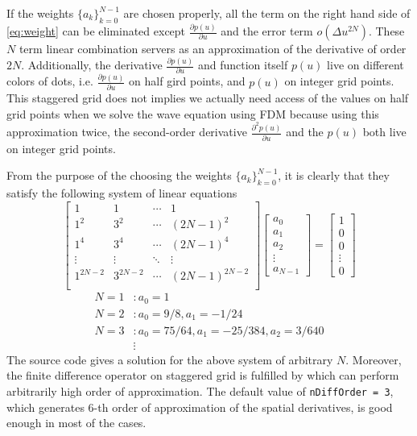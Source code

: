 \documentclass[11pt]{article}
\theoremstyle{plain}
\theoremstyle{definition}
\theoremstyle{remark}
\numberwithin{equation}{section}
\begin{document}
If the weights $\{ a_k\}_{k=0}^{N-1}$ are chosen properly, all the term on the right hand side of \eqref{eq:weight} can be eliminated except $\frac{\partial p(u)}{\partial u}$ and the error term $o(\Delta u^{2N})$. These $N$ term linear combination servers as an approximation of the derivative of order $2N$. Additionally, the derivative $\frac{\partial p(u)}{\partial u}$ and function itself $p(u)$ live on different colors of dots, i.e. $\frac{\partial p(u)}{\partial u}$ on half gird points, and $p(u)$ on integer grid points. This staggered grid does not implies we actually need access of the values on half grid points when we solve the wave equation using FDM because using this approximation twice, the second-order derivative $\frac{\partial^2 p(u)}{\partial u}$ and the $p(u)$ both live on integer grid points.

From the purpose of the choosing the weights $\{a_k\}_{k=0}^{N-1}$, it is clearly that they satisfy the following system of linear equations
\begin{equation*}
\begin{bmatrix}
  1 & 1 & \cdots & 1 \\
  1^2 & 3^2 & \cdots & (2N-1)^2 \\
  1^4 & 3^4 & \cdots & (2N-1)^4 \\
  \vdots & \vdots & \ddots & \vdots \\
  1^{2N-2} & 3^{2N-2} & \cdots & (2N-1)^{2N-2} \\
\end{bmatrix}
\begin{bmatrix}
  a_0 \\ a_1 \\ a_2 \\ \vdots \\ a_{N-1}
\end{bmatrix}
=
\begin{bmatrix}
  1 \\ 0 \\ 0 \\ \vdots \\ 0
\end{bmatrix}
\end{equation*}
\begin{equation*}
  \begin{aligned}
  N = 1&: a_0 = 1\\
  N = 2&: a_0 = 9/8, a_1 = -1/24\\
  N = 3&: a_0 = 75/64, a_1 = -25/384, a_2 = 3/640\\
  &\vdots
  \end{aligned}
\end{equation*}
The source code  gives a solution for the above system of arbitrary $N$. Moreover, the finite difference operator on staggered grid is fulfilled by  which can perform arbitrarily high order of approximation. The default value of \texttt{nDiffOrder = 3}, which generates 6-th order of approximation of the spatial derivatives, is good enough in most of the cases.
\end{document}
